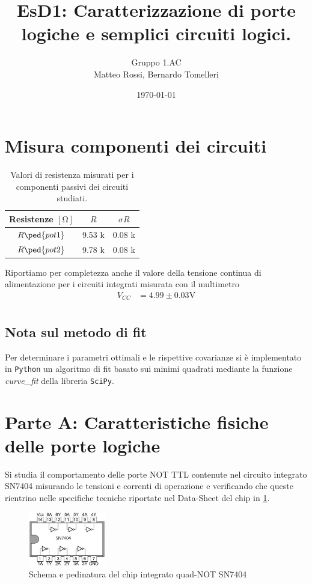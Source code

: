 \documentclass[10pt, a4paper, italian]{article}
\author{Gruppo 1.AC \\ Matteo Rossi, Bernardo Tomelleri}
\title{EsD1: Caratterizzazione di porte logiche e semplici circuiti logici.}
\begin{document}
\date{\today}
\maketitle

\section*{Misura componenti dei circuiti}
\begin{table}[htbp]
\centering
\begin{tabular}{ccc}
\toprule
Resistenze $[\si{\ohm}]$ & $R$ & $\sigma R$ \\
\midrule
\midrule
$R\ped{pot1}$	& 9.53 k	& 0.08 k 		\\
$R\ped{pot2}$	& 9.78 k	& 0.08 k 		\\

\bottomrule     
\end{tabular}
\caption{Valori di resistenza misurati per i componenti passivi dei circuiti
studiati. \label{tab: rmesM}}
\end{table}

Riportiamo per completezza anche il valore della tensione continua di
alimentazione per i circuiti integrati misurata con il multimetro
\begin{align*}
V_{CC} &= 4.99 \pm 0.03 \si{\V} \\
\end{align*}

\subsection*{Nota sul metodo di fit}
Per determinare i parametri ottimali e le rispettive covarianze si \`e
implementato in \verb+Python+ un algoritmo di fit basato sui minimi quadrati
mediante la funzione \emph{curve\_fit} della libreria \texttt{SciPy}.

\setcounter{section}{0}
\section*{Parte A: Caratteristiche fisiche delle porte logiche}
Si studia il comportamento delle porte NOT TTL contenute nel circuito
integrato SN7404 misurando le tensioni e correnti di operazione e verificando
che queste rientrino nelle specifiche tecniche riportate nel Data-Sheet del
chip in \cref{fig: SN7404}.
\begin{figure}[htbp]
\centering
    \includegraphics[width=0.3\textwidth]{SN7404}
    \caption{Schema e pedinatura del chip integrato
    quad-NOT SN7404 \label{fig: SN7404}}
\end{figure}
\end{document}

